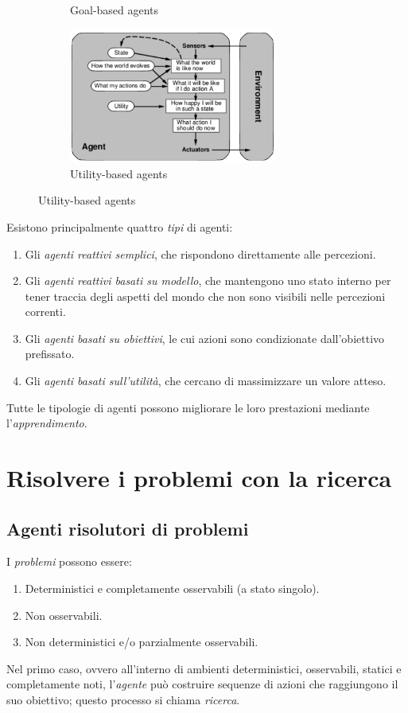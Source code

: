 \documentclass[11pt,oneside]{book}
\begin{document}
\begin{figure}[htp]
\begin{subfigure}{0.49\textwidth}
		\caption{Goal-based agents}
	\end{subfigure}
	\hfill
	\begin{subfigure}{0.49\textwidth}
	    \centering
		\includegraphics[width=0.75\textwidth]{utility-based.png}
		\caption{Utility-based agents}
	\end{subfigure}
\end{figure}
Esistono principalmente quattro \textit{tipi} di agenti:
\begin{enumerate}[label=(\alph*)]
	\item Gli \textit{agenti reattivi semplici}, che rispondono direttamente alle percezioni.
	\item Gli \textit{agenti reattivi basati su modello}, che mantengono uno stato interno per tener traccia degli aspetti del mondo che non sono visibili nelle percezioni correnti.
	\item Gli \textit{agenti basati su obiettivi}, le cui azioni sono condizionate dall'obiettivo prefissato.
	\item Gli \textit{agenti basati sull'utilità}, che cercano di massimizzare un valore atteso.
\end{enumerate}
Tutte le tipologie di agenti possono migliorare le loro prestazioni mediante l'\textit{apprendimento}.


\chapter{Risolvere i problemi con la ricerca}

\section{Agenti risolutori di problemi}
I \textit{problemi} possono essere:
\begin{enumerate}
	\item Deterministici e completamente osservabili (a stato singolo).
	\item Non osservabili.
	\item Non deterministici e/o parzialmente osservabili.
\end{enumerate}
Nel primo caso, ovvero all'interno di ambienti deterministici, osservabili, statici e completamente noti, l'\textit{agente} può costruire sequenze di azioni che raggiungono il suo obiettivo; questo processo si chiama \textit{ricerca}.
\end{document}
